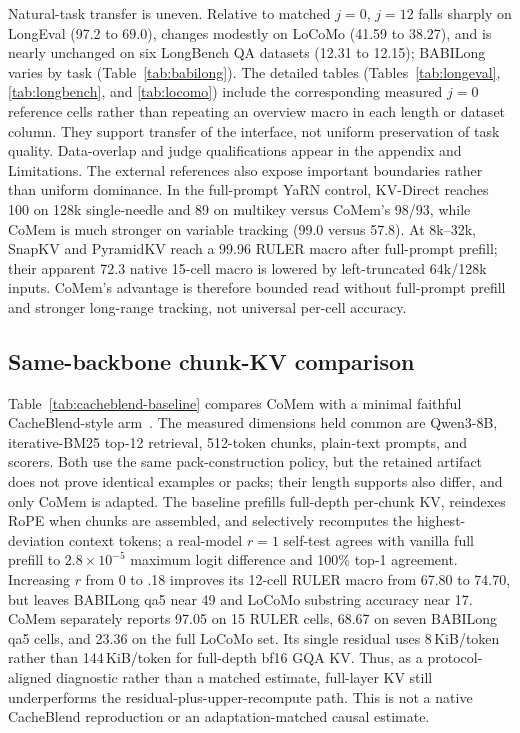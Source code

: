Natural-task transfer is uneven. Relative to matched $j{=}0$, $j{=}12$
falls sharply on LongEval (97.2 to 69.0), changes modestly on LoCoMo (41.59 to
38.27), and is nearly unchanged on six LongBench QA datasets (12.31 to 12.15);
BABILong varies by task
(Table~\ref{tab:babilong}). The detailed tables
(Tables~\ref{tab:longeval}, \ref{tab:longbench}, and \ref{tab:locomo}) include
the corresponding measured $j{=}0$ reference cells rather than repeating an
overview macro in each length or dataset column. They support transfer of the
interface, not uniform preservation of task quality.
Data-overlap and judge qualifications appear in the appendix and Limitations.
The external references also expose important boundaries rather than uniform
dominance. In the full-prompt YaRN control, KV-Direct reaches 100 on 128k
single-needle and 89 on multikey versus CoMem's 98/93, while CoMem is much
stronger on variable tracking (99.0 versus 57.8). At 8k--32k, SnapKV and
PyramidKV reach a 99.96 RULER macro after full-prompt prefill; their apparent
72.3 native 15-cell macro is lowered by left-truncated 64k/128k inputs. CoMem's
advantage is therefore bounded read without full-prompt prefill and stronger
long-range tracking, not universal per-cell accuracy.

\subsection{Same-backbone chunk-KV comparison}

Table~\ref{tab:cacheblend-baseline} compares CoMem with a minimal faithful
CacheBlend-style arm~\citep{cacheblend}. The measured dimensions held common
are Qwen3-8B, iterative-BM25 top-12 retrieval, 512-token chunks, plain-text
prompts, and scorers. Both use the same pack-construction policy, but the
retained artifact does not prove identical examples or packs; their length
supports also differ, and only CoMem is adapted. The baseline prefills
full-depth per-chunk KV, reindexes
RoPE when chunks are assembled, and selectively recomputes the highest-deviation
context tokens; a real-model $r{=}1$ self-test agrees with vanilla full prefill
to $2.8\!\times\!10^{-5}$ maximum logit difference and 100\% top-1 agreement.
Increasing $r$ from 0 to .18 improves its 12-cell RULER macro from 67.80 to
74.70, but leaves BABILong qa5 near 49 and LoCoMo substring accuracy near 17.
CoMem separately reports 97.05 on 15 RULER cells, 68.67 on seven BABILong qa5
cells, and 23.36 on the full LoCoMo set. Its single residual
uses 8\,KiB/token rather than 144\,KiB/token for full-depth bf16 GQA KV. Thus,
as a protocol-aligned diagnostic rather than a matched estimate, full-layer KV
still underperforms the residual-plus-upper-recompute path. This is not a native
CacheBlend reproduction or an adaptation-matched causal estimate.

